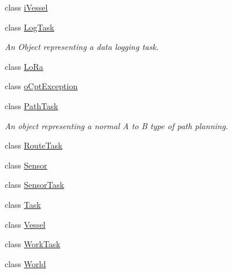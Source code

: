 \begin{DoxyCompactItemize}
class \hyperlink{classo_cpt_1_1i_vessel}{i\+Vessel}
\item 
class \hyperlink{classo_cpt_1_1_log_task}{Log\+Task}
\begin{DoxyCompactList}\small\item\em An Object representing a data logging task. \end{DoxyCompactList}\item 
class \hyperlink{classo_cpt_1_1_lo_ra}{Lo\+Ra}
\item 
class \hyperlink{classo_cpt_1_1o_cpt_exception}{o\+Cpt\+Exception}
\item 
class \hyperlink{classo_cpt_1_1_path_task}{Path\+Task}
\begin{DoxyCompactList}\small\item\em An object representing a normal A to B type of path planning. \end{DoxyCompactList}\item 
class \hyperlink{classo_cpt_1_1_route_task}{Route\+Task}
\item 
class \hyperlink{classo_cpt_1_1_sensor}{Sensor}
\item 
class \hyperlink{classo_cpt_1_1_sensor_task}{Sensor\+Task}
\item 
class \hyperlink{classo_cpt_1_1_task}{Task}
\item 
class \hyperlink{classo_cpt_1_1_vessel}{Vessel}
\item 
class \hyperlink{classo_cpt_1_1_work_task}{Work\+Task}
\item 
class \hyperlink{classo_cpt_1_1_world}{World}
\end{DoxyCompactItemize}

